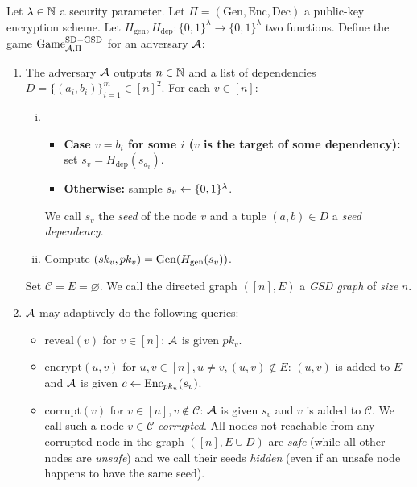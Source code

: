\begin{definition}

	Let $\lambda \in \mathbb{N}$ a security parameter.  Let $\Pi = (\mathrm{Gen}, \mathrm{Enc}, \mathrm{Dec})$ a public-key encryption scheme. Let $H_{\mathrm{gen}}, H_{\mathrm{dep}} \colon \{0, 1\}^\lambda \to \{0, 1\}^\lambda$ two functions. Define the game $\mathrm{Game}_{\mathcal{A}, \Pi}^{\mathrm{SD-GSD}}$ for an adversary $\mathcal{A}$:
	\begin{enumerate}[1.]
		\item \label{def:sd-gsd-game-step-1} The adversary $\mathcal{A}$ outputs $n \in \mathbb{N}$ and a list of dependencies $D = \{(a_{i}, b_{i})\}_{i=1}^m \in [n]^2$. For each $v \in [n]$:
		      \begin{enumerate}[(i)]
			      \item \begin{itemize}
				            \item \textbf{Case $v = b_i$ for some $i$ ($v$ is the target of some dependency):} set $s_v = H_{\mathrm{dep}}(s_{a_i})$.
				            \item \textbf{Otherwise:} sample $s_v \leftarrow \{0, 1\}^\lambda$.
			            \end{itemize}
			            We call $s_v$ the \emph{seed} of the node $v$ and a tuple $(a, b) \in D$ a \emph{seed dependency}.
			      \item Compute $(sk_v, pk_v) = \mathrm{Gen}(H_\mathrm{gen}(s_v))$. 
		      \end{enumerate}
		      Set $\mathcal{C} = E = \varnothing$. We call the directed graph $([n], E)$ a \emph{GSD graph} of \emph{size} $n$.
		\item $\mathcal{A}$ may adaptively do the following queries:
		      \begin{itemize}
			      \item $\mathrm{reveal}(v)$ for $v \in [n]$: $\mathcal{A}$ is given $pk_v$.
			      \item $\mathrm{encrypt}(u, v)$ for $u, v \in [n], u \neq v, (u, v) \notin E$: $(u, v)$ is added to $E$ and $\mathcal{A}$ is given $c \leftarrow \mathrm{Enc}_{pk_u}(s_v)$.
			      \item $\mathrm{corrupt}(v)$ for $v \in [n], v \notin \mathcal{C}$: $\mathcal{A}$ is given $s_v$ and $v$ is added to $\mathcal{C}$. We call such a node $v \in \mathcal{C}$ \emph{corrupted}. All nodes not reachable from any corrupted node in the graph $([n], E \cup D)$ are \emph{safe} (while all other nodes are \emph{unsafe}) and we call their seeds \emph{hidden} (even if an unsafe node happens to have the same seed).

\end{itemize}
\end{enumerate}
\end{definition}
